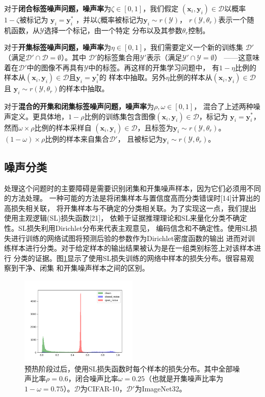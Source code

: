 \documentclass[12pt]{article}
\begin{document}
对于\textbf{闭合标签噪声问题，噪声率}为$\zeta \in [0,1]$，我们假定
$(\mathbf{x}_i,\mathbf{y}_i) \in \mathcal{D}$以概率$1-\zeta$被标记为
$\mathbf{y}_i = \mathbf{y}^*_i$ ，并以$\zeta$概率被标记为$\mathbf{y}_i \sim r(\mathcal{Y})$，
$r(\mathcal{Y},\theta_r)$表示一个随机函数，从$\mathcal{Y}$选择一个标记，由一个特定
分布以及其参数$\theta_r$控制。

对于\textbf{开集标签噪声问题，噪声率}为$\eta \in [0,1]$，我们需要定义一个新的训练集
$\mathcal{D'}$（满足$\mathcal{D'} \cap \mathcal{D} = \emptyset$）。其中
$\mathcal{D'}$的标签集合用$\mathcal{Y'}$表示（满足$\mathcal{Y'} \cap \mathcal{Y} = \emptyset$）
——这意味着在$\mathcal{D'}$中的图像不再具有$\mathcal{Y}$中的标签。再这样的开集学习问题中，
有$1-\eta$比例的样本从$(\mathbf{x}_i,\mathbf{y}_i) \in \mathcal{D}$且$\mathbf{y}_i=\mathbf{y}^{*}_i$的
样本中抽取。另外$\eta$比例的样本从$(\mathbf{x}_i,\mathbf{y}_i) \in \mathcal{D}$且
$\mathbf{y}_i  \sim r(\mathcal{Y},\theta_r)$的样本中抽取。

对于\textbf{混合的开集和闭集标签噪声问题，噪声率}为$\rho,\omega \in [0,1]$，
混合了上述两种噪声定义。更具体地，$1 - \rho$比例的训练集包含图像$(\mathbf{x}_i,\mathbf{y}_i) \in \mathcal{D}$，标记为
$\mathbf{y}_i = \mathbf{y}_i^{*}$，然而$\omega \times \rho$比例的样本采样自
$(\mathbf{x}_i,\mathbf{y}_i) \in \mathcal{D}$，且标签为$\mathbf{y}_i  \sim r(\mathcal{Y},\theta_r)$。
$(1 - \omega) \times \rho$比例的样本来自集合$\mathcal{D}'$，
且被标记为$\mathbf{y}_i  \sim r(\mathcal{Y},\theta_r)$。

\subsection{噪声分类}
处理这个问题时的主要障碍是需要识别闭集和开集噪声样本，因为它们必须用不同的方法处理。
一种可能的方法是将闭集样本与置信度高而分类错误时[14]计算出的高损失相关联，
将开集样本与不确定的分类相关联。为了实现这一点，我们提出使用主观逻辑(SL)损失函数[21]，
依赖于证据推理理论和SL来量化分类不确定性。SL损失利用Dirichlet分布来代表主观意见，
编码信念和不确定性。使用SL损失进行训练的网络试图将预测后验的参数作为Dirichlet密度函数的输出
进而对训练样本进行分类。对于给定样本的输出结果被认为是在一组类别标签上对该样本进行
分类的证据。图\ref{fig3}显示了使用SL损失训练的网络中样本的损失分布。很容易观察到干净、闭集
和开集噪声样本之间的区别。
\begin{figure}[h]
    \centering
    \includegraphics[width=0.5\textwidth]{images/textbook.png}
    \caption{预热阶段过后，使用SL损失函数时每个样本的损失分布。其中全部噪声比率$\rho = 0.6$，闭合噪声比率$\omega = 0.25$（也就是开集噪声比率为$1-\omega = 0.75$）。$\mathcal{D}$为CIFAR-10，$\mathcal{D}'$为ImageNet32。}
    \label{fig3}
\end{figure}
\end{document}
